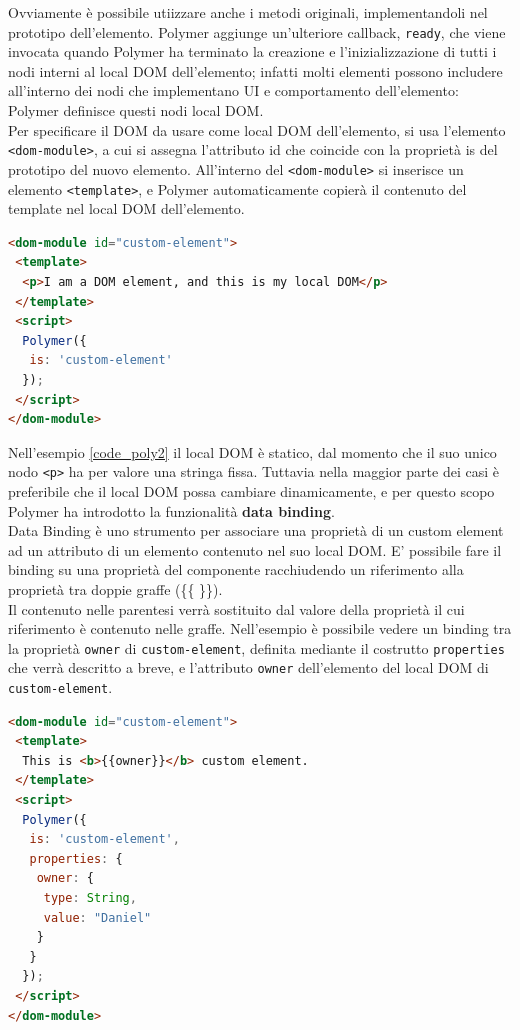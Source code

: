Ovviamente è possibile utiizzare anche i metodi originali, implementandoli nel prototipo dell’elemento. Polymer aggiunge un’ulteriore callback, \texttt{ready}, che viene invocata quando Polymer ha terminato la creazione e l’inizializzazione di tutti i nodi interni al local DOM dell’elemento; infatti molti elementi possono includere all’interno dei nodi che implementano UI e comportamento dell’elemento: Polymer definisce questi nodi local DOM.
\\
Per specificare il DOM da usare come local DOM dell’elemento, si usa l’elemento \texttt{<dom-module>}, a cui si assegna l’attributo id che coincide con la proprietà is del prototipo del nuovo elemento. All’interno del \texttt{<dom-module>} si inserisce un elemento \texttt{<template>}, e Polymer automaticamente copierà il contenuto del template nel local DOM dell’elemento.
\begin{lstlisting}[language=html,label={code_poly2}]
<dom-module id="custom-element">
 <template>
  <p>I am a DOM element, and this is my local DOM</p>
 </template>
 <script>
  Polymer({
   is: 'custom-element'
  });
 </script>
</dom-module>
\end{lstlisting}
Nell’esempio \ref{code_poly2} il local DOM è statico, dal momento che il suo unico nodo \texttt{<p>} ha per valore una stringa fissa. Tuttavia nella maggior parte dei casi è preferibile che il local DOM possa cambiare dinamicamente, e per questo scopo Polymer ha introdotto la funzionalità \textbf{data binding}.
\\
Data Binding è uno strumento per associare una proprietà di un custom element ad un attributo di un elemento contenuto nel suo local DOM. E’ possibile fare il binding su una proprietà del componente racchiudendo un riferimento alla proprietà tra doppie graffe (\{\{ \}\}). 
\\
Il contenuto nelle parentesi verrà sostituito dal valore della proprietà il cui riferimento è contenuto nelle graffe. Nell’esempio è possibile vedere un binding tra la proprietà \texttt{owner} di \texttt{custom-element}, definita mediante il costrutto \texttt{properties} che verrà descritto a breve, e l’attributo \texttt{owner} dell’elemento del local DOM di \texttt{custom-element}. 
\begin{lstlisting}[language=html]
<dom-module id="custom-element">
 <template>
  This is <b>{{owner}}</b> custom element.
 </template>
 <script>
  Polymer({
   is: 'custom-element',
   properties: {
    owner: {
     type: String,
     value: "Daniel"
    }
   }
  });
 </script>
</dom-module>
\end{lstlisting}
